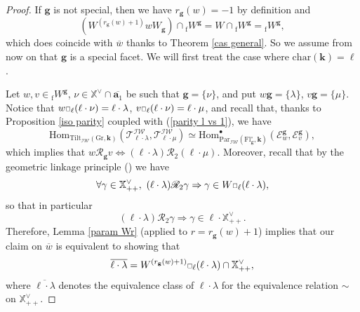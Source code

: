 \documentclass[11pt]{amsart}
\theoremstyle{plain}
\theoremstyle{remark}
\newcommand{\car}{\mbox{\relsize{-5}$\Box$}}
\numberwithin{equation}{section}
\begin{document}
	\begin{proof}
		If $\mathbf{g}$ is not special, then we have $r_\mathbf{g}(w)=-1$ by definition and $$(W^{(r_\mathbf{g}(w)+1)}wW_\mathbf{g})\cap {_\mathrm{f}W}^\mathbf{g}=W\cap {_\mathrm{f}W}^\mathbf{g}={_\mathrm{f}W}^\mathbf{g},$$ which does coincide with $\overline{w}$ thanks to Theorem \ref{cas general}. So we assume from now on that $\mathbf{g}$ is a special facet. We will first treat the case where $\mathrm{char}(\mathbf{k})=\ell$.
		
		Let $w,v\in {_\mathrm{f}W}^\mathbf{g}$, $\nu\in \mathbb{X}^\vee\cap\overline{\mathbf{a}_1}$ be such that $\mathbf{g}=\{\nu\}$, and put $w\mathbf{g}=\{\lambda\}$, $v\mathbf{g}=\{\mu\}$. Notice that  $w\car_\ell(\ell\cdot\nu)=\ell\cdot\lambda$, $v\car_\ell(\ell\cdot\nu)=\ell\cdot\mu$, and recall that, thanks to Proposition \ref{iso parity} coupled with (\ref{parity l vs 1}), we have 
		$$\mathrm{Hom}_{\mathrm{Tilt}_\mathcal{IW}(\mathrm{Gr},\mathbf{k})}(\mathscr{T}^\mathcal{IW}_{\ell\cdot\lambda},\mathscr{T}^\mathcal{IW}_{\ell\cdot\mu})\simeq \mathrm{Hom}^\bullet_{\mathrm{Par}_{\mathcal{IW}}(\mathrm{Fl}^{\circ}_{\mathbf{g}},\mathbf{k})}(\mathcal{E}_w^{\mathbf{g}},\mathcal{E}_{v}^{\mathbf{g}}),$$
		which implies that $w\mathscr{R}_\mathbf{g}v\Leftrightarrow (\ell\cdot\lambda)\mathscr{R}_2 (\ell\cdot\mu)$. Moreover, recall that by the geometric linkage principle (\cite[Theorem 8.5]{riche2020smithtreumann}) we have \begin{equation*}
			\forall\gamma\in\mathbb{X}^\vee_{++},~(\ell\cdot\lambda)\mathscr{R}_2 \gamma\Rightarrow\gamma\in W\car_\ell (\ell\cdot\lambda),
		\end{equation*}
		so that in particular \begin{equation}\label{orbit implique l}
			(\ell\cdot\lambda)\mathscr{R}_2 \gamma\Rightarrow\gamma\in\ell\cdot\mathbb{X}^\vee_{++}.
		\end{equation} Therefore, Lemma \ref{param Wr} (applied to $r=r_\mathbf{g}(w)+1$) implies that our claim on $\overline{w}$ is equivalent to showing that $$\overline{\ell\cdot\lambda}=W^{(r_\mathbf{g}(w)+1)}\car_\ell (\ell\cdot\lambda)\cap\mathbb{X}^{\vee}_{++},$$
		where $\overline{\ell\cdot\lambda}$ denotes the equivalence class of $\ell\cdot\lambda$ for the equivalence relation $\sim$ on $\mathbb{X}^\vee_{++}$.
		

\end{proof}
\end{document}
